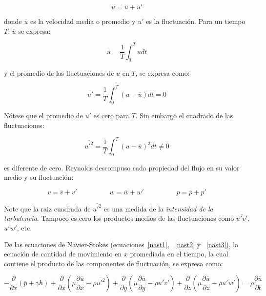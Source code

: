 \documentclass[11pt, oneside]{article}
\begin{document}
\begin{equation}
u = \overline{u} + u'
\label{tur1}
\end{equation}

donde $\overline{u}$ es la velocidad media o promedio y $u'$ es la fluctuaci\'on. Para un tiempo $T$, $\overline{u}$ se expresa:

\begin{equation}
\overline{u} = \frac{1}{T} \int_0^T u dt
\label{tur2}
\end{equation}

y el promedio de las fluctuaciones de $u$ en $T$, se expresa como:

\begin{equation}
\overline{u'} = \frac{1}{T} \int_0^T (u-\overline{u}) dt = 0
\label{tur3}
\end{equation}

N\'otese que el promedio de $u'$ es cero para $T$. Sin embargo el cuadrado de las fluctuaciones:

\begin{equation}
\overline{{u'}^2} = \frac{1}{T} \int_0^T (u-\overline{u})^2 dt \neq 0
\label{tur4}
\end{equation}
 
es diferente de cero. Reynolds descompuso cada propiedad del flujo en su valor medio y su fluctuaci\'on:

\begin{equation}
v = \overline{v} + v' \hspace{2cm} w = \overline{w} + w' \hspace{2cm} p = \overline{p} + p'
\label{tur44}
\end{equation}

Note que la raiz cuadrada de $\overline{{u'}^2}$  es una medida de la \emph{intensidad de la turbulencia}. Tampoco es cero los productos medios de las fluctuaciones como $\overline{u' v'}$, $\overline{u' w'}$, etc.

De las ecuaciones de Navier-Stokes (ecuaciones~\ref{nast1}, ~\ref{nast2} y ~\ref{nast3}), la ecuaci\'on de cantidad de movimiento en $x$ promediada en el tiempo, la cual contiene el producto de las componentes de fluctuaci\'on, se expresa como:

\begin{equation}
-\frac{\partial}{\partial x}(\overline{p} + \gamma h) + \frac{\partial}{\partial x}\left( \mu \frac{\partial \overline{u}}{\partial x} - \rho \overline{{u'}^2} \right) + \frac{\partial}{\partial y}\left( \mu \frac{\partial \overline{u}}{\partial y} - \rho \overline{u' v'} \right) + \frac{\partial}{\partial z}\left( \mu \frac{\partial \overline{u}}{\partial z} - \rho \overline{u' w'} \right) = \rho \frac{\partial \overline{u}}{\partial t}
\label{tur5}
\end{equation}
\end{document}
